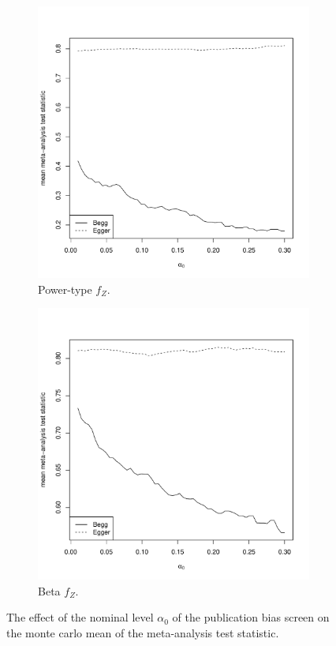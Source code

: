 \documentclass[12pt]{article}
\newcommand{\z}{Z}
\begin{document}
\begin{figure}
\label{fig:alpha_0}
  \begin{subfigure}{.5\textwidth}
    \includegraphics[width=\linewidth]{fig_alpha_0_power.pdf}
    \caption{Power-type $f_\z$.}
  \end{subfigure}
  \begin{subfigure}{.5\textwidth}
    \includegraphics[width=\linewidth]{fig_alpha_0_beta.pdf}
    \caption{Beta $f_\z$.}
  \end{subfigure}
\caption{The effect of the nominal level $\alpha_0$ of the publication bias screen on the monte carlo mean of the meta-analysis test statistic.}\label{fig:alpha_0}
\end{figure}
\end{document}
